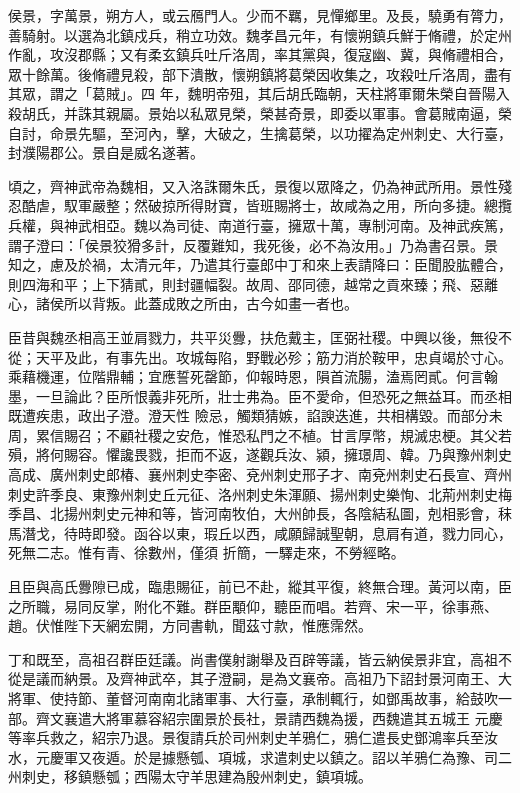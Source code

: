 
\begin{pinyinscope}

 侯景，字萬景，朔方人，或云鴈門人。少而不羈，見憚鄉里。及長，驍勇有膂力，善騎射。以選為北鎮戍兵，稍立功效。魏孝昌元年，有懷朔鎮兵鮮于脩禮，於定州作亂，攻沒郡縣；又有柔玄鎮兵吐斤洛周，率其黨與，復寇幽、冀，與脩禮相合，眾十餘萬。後脩禮見殺，部下潰散，懷朔鎮將葛榮因收集之，攻殺吐斤洛周，盡有其眾，謂之「葛賊」。四
 年，魏明帝殂，其后胡氏臨朝，天柱將軍爾朱榮自晉陽入殺胡氏，并誅其親屬。景始以私眾見榮，榮甚奇景，即委以軍事。會葛賊南逼，榮自討，命景先驅，至河內，擊，大破之，生擒葛榮，以功擢為定州刺史、大行臺，封濮陽郡公。景自是威名遂著。



 頃之，齊神武帝為魏相，又入洛誅爾朱氏，景復以眾降之，仍為神武所用。景性殘忍酷虐，馭軍嚴整；然破掠所得財寶，皆班賜將士，故咸為之用，所向多捷。總攬兵權，與神武相亞。魏以為司徒、南道行臺，擁眾十萬，專制河南。及神武疾篤，謂子澄曰：「侯景狡猾多計，反覆難知，我死後，必不為汝用。」乃為書召景。景
 知之，慮及於禍，太清元年，乃遣其行臺郎中丁和來上表請降曰：臣聞股肱體合，則四海和平；上下猜貳，則封疆幅裂。故周、邵同德，越常之貢來臻；飛、惡離心，諸侯所以背叛。此蓋成敗之所由，古今如畫一者也。



 臣昔與魏丞相高王並肩戮力，共平災釁，扶危戴主，匡弼社稷。中興以後，無役不從；天平及此，有事先出。攻城每陷，野戰必殄；筋力消於鞍甲，忠貞竭於寸心。乘藉機運，位階鼎輔；宜應誓死罄節，仰報時恩，隕首流腸，溘焉罔貳。何言翰墨，一旦論此？臣所恨義非死所，壯士弗為。臣不愛命，但恐死之無益耳。而丞相既遭疾患，政出子澄。澄天性
 險忌，觸類猜嫉，諂諛迭進，共相構毀。而部分未周，累信賜召；不顧社稷之安危，惟恐私門之不植。甘言厚幣，規滅忠梗。其父若殞，將何賜容。懼讒畏戮，拒而不返，遂觀兵汝、潁，擁璟周、韓。乃與豫州刺史高成、廣州刺史郎椿、襄州刺史李密、兗州刺史邢子才、南兗州刺史石長宣、齊州刺史許季良、東豫州刺史丘元征、洛州刺史朱渾願、揚州刺史樂恂、北荊州刺史梅季昌、北揚州刺史元神和等，皆河南牧伯，大州帥長，各陰結私圖，剋相影會，秣馬潛戈，待時即發。函谷以東，瑕丘以西，咸願歸誠聖朝，息肩有道，戮力同心，死無二志。惟有青、徐數州，僅須
 折簡，一驛走來，不勞經略。



 且臣與高氏釁隙已成，臨患賜征，前已不赴，縱其平復，終無合理。黃河以南，臣之所職，易同反掌，附化不難。群臣顒仰，聽臣而唱。若齊、宋一平，徐事燕、趙。伏惟陛下天網宏開，方同書軌，聞茲寸款，惟應霈然。



 丁和既至，高祖召群臣廷議。尚書僕射謝舉及百辟等議，皆云納侯景非宜，高祖不從是議而納景。及齊神武卒，其子澄嗣，是為文襄帝。高祖乃下詔封景河南王、大將軍、使持節、董督河南南北諸軍事、大行臺，承制輒行，如鄧禹故事，給鼓吹一部。齊文襄遣大將軍慕容紹宗圍景於長社，景請西魏為援，西魏遣其五城王
 元慶等率兵救之，紹宗乃退。景復請兵於司州刺史羊鴉仁，鴉仁遣長史鄧鴻率兵至汝水，元慶軍又夜遁。於是據懸瓠、項城，求遣刺史以鎮之。詔以羊鴉仁為豫、司二州刺史，移鎮懸瓠；西陽太守羊思建為殷州刺史，鎮項城。




\end{pinyinscope}
